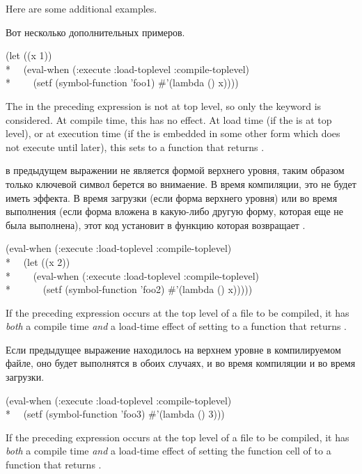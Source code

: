 \begin{newer}
\begin{defspec}
\begin{itemize}
\end{itemize}

Here are some additional examples.

Вот несколько дополнительных примеров.
\begin{lisp} 
(let ((x 1)) \\*
~~(eval-when (:execute :load-toplevel :compile-toplevel) \\*
~~~~(setf (symbol-function 'foo1) \#'(lambda () x))))
\end{lisp}
 The  in the preceding expression is not at top level,
       so only the 
       keyword is considered.  At compile time, this has no effect.
       At load time (if the  is at top level), or at execution time
       (if the  is embedded in some other form which does not execute
       until later), this sets  to a function that
       returns .

 в предыдущем выражении не является формой верхнего уровня, таким
образом только ключевой символ  берется во внимаение. В время
компиляции, это не будет иметь эффекта. В время загрузки (если  форма
верхнего уровня) или во время выполнения (если форма  вложена в
какую-либо другую форму, которая еще не была выполнена), этот код установит
в  функцию которая возвращает .

\begin{lisp}
(eval-when (:execute :load-toplevel :compile-toplevel) \\*
~~(let ((x 2)) \\*
~~~~(eval-when (:execute :load-toplevel :compile-toplevel) \\*
~~~~~~(setf (symbol-function 'foo2) \#'(lambda () x)))))
\end{lisp}

 If the preceding expression occurs at the top level of a file to be compiled,
       it has \textit{both} a compile time \textit{and} a load-time effect of setting
        to a function that returns .

Если предыдущее выражение находилось на верхнем уровне в компилируемом файле, оно
будет выполнятся в обоих случаях, и во время компиляции и во время загрузки.
\begin{lisp}
(eval-when (:execute :load-toplevel :compile-toplevel) \\*
~~(setf (symbol-function 'foo3) \#'(lambda () 3)))
\end{lisp}
 If the preceding expression occurs at the top level of a file to be compiled,
       it has \textit{both} a compile time \textit{and}
       a load-time effect of setting the
       function cell of  to a function that returns .


\end{defspec}
\end{newer}
